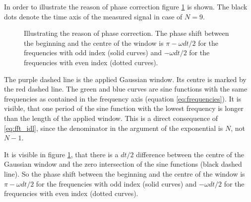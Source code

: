 \documentclass[a4paper,12pt,oneside]{article}
\begin{document}
In order to illustrate the reason of phase correction figure \ref{fig:phase_correction} is shown. The black dots denote the time axis of the measured signal in case of $N = 9$.
\begin{figure}[htb!]
  \centerline{}
  \caption{\label{fig:phase_correction} Illustrating the reason of phase correction. The phase shift between the beginning and the centre of the window is $\pi-\omega dt/2$ for the frequencies with odd index (solid curves) and $-\omega dt/2$ for the frequencies with even index (dotted curves).}
\end{figure}
The purple dashed line is the applied Gaussian window. Its centre is marked by the red dashed line. The green and blue curves are sine functions with the same frequencies as contained in the frequency axis (equation \eqref{eq:frequencies}). It is visible, that one period of the sine function with the lowest frequency is longer than the length of the applied window. This is a direct consequence of \eqref{eq:fft_idl}, since the denominator in the argument of the exponential is $N$, not $N-1$.

It is visible in figure \ref{fig:phase_correction}, that there is a $dt/2$ difference between the centre of the Gaussian window and the zero intersection of the sine functions (black dashed line). So the phase shift between the beginning and the centre of the window is $\pi-\omega dt/2$ for the frequencies with odd index (solid curves) and $-\omega dt/2$ for the frequencies with even index (dotted curves).
\end{document}
